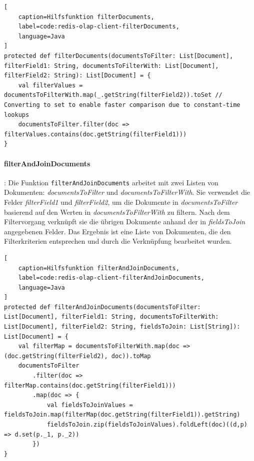 \begin{lstlisting}[
    caption=Hilfsfunktion filterDocuments,
    label=code:redis-olap-client-filterDocuments,
    language=Java
]
protected def filterDocuments(documentsToFilter: List[Document], filterField1: String, documentsToFilterWith: List[Document], filterField2: String): List[Document] = {
	val filterValues = documentsToFilterWith.map(_.getString(filterField2)).toSet // Converting to set to enable faster comparison due to constant-time lookups
	documentsToFilter.filter(doc => filterValues.contains(doc.getString(filterField1)))
}
\end{lstlisting}


\paragraph{filterAndJoinDocuments}: Die Funktion \lstinline|filterAndJoinDocuments| arbeitet mit zwei Listen von Dokumenten: \emph{documentsToFilter} und \emph{documentsToFilterWith}. Sie verwendet die Felder \emph{filterField1} und \emph{filterField2}, um die Dokumente in \emph{documentsToFilter} basierend auf den Werten in \emph{documentsToFilterWith} zu filtern. Nach dem Filtervorgang verknüpft sie die übrigen Dokumente anhand der in \emph{fieldsToJoin} angegebenen Felder. Das Ergebnis ist eine Liste von Dokumenten, die den Filterkriterien entsprechen und durch die Verknüpfung bearbeitet wurden.

\begin{lstlisting}[
    caption=Hilfsfunktion filterAndJoinDocuments,
    label=code:redis-olap-client-filterAndJoinDocuments,
    language=Java
]
protected def filterAndJoinDocuments(documentsToFilter: List[Document], filterField1: String, documentsToFilterWith: List[Document], filterField2: String, fieldsToJoin: List[String]): List[Document] = {
	val filterMap = documentsToFilterWith.map(doc => (doc.getString(filterField2), doc)).toMap
	documentsToFilter
		.filter(doc => filterMap.contains(doc.getString(filterField1)))
		.map(doc => {
			val fieldsToJoinValues = fieldsToJoin.map(filterMap(doc.getString(filterField1)).getString)
			fieldsToJoin.zip(fieldsToJoinValues).foldLeft(doc)((d,p) => d.set(p._1, p._2))
		})
}
\end{lstlisting}

